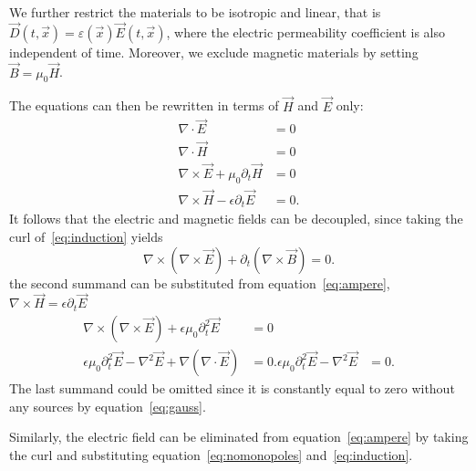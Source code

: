 We further restrict the materials to be isotropic and linear, that is
$\vec{D}(t, \vec{x}) = \varepsilon(\vec{x}) \vec{E}(t, \vec{x})$, where the
electric permeability coefficient is also independent of time. Moreover, we
exclude magnetic materials by setting $\vec{B} = \mu_0 \vec{H}$.

The equations can then be rewritten in terms of $\vec{H}$ and $\vec{E}$ only:
\begin{align}
    \nabla \cdot \vec{E} &= 0 \label{eq:gauss}\\
    \nabla \cdot \vec{H} &= 0 \label{eq:nomonopoles}\\
    \nabla \times \vec{E} + \mu_0\partial_t \vec{H} &= 0
    \label{eq:induction}\\
    \nabla \times \vec{H} - \epsilon\partial_t \vec{E} &= 0
    \label{eq:ampere}.
\end{align}
It follows that the electric and magnetic fields can be decoupled, since
taking the curl of~\eqref{eq:induction} yields
\begin{equation}
    \nabla \times (\nabla \times \vec{E}) + \partial_t(\nabla \times
    \vec{B}) = 0.
    \label{}
\end{equation}
the second summand can be substituted from equation~\eqref{eq:ampere},
$\nabla \times \vec{H} = \epsilon\partial_t \vec{E}$
\begin{align}
    \nabla \times (\nabla \times \vec{E}) + \epsilon\mu_0\partial_t^2 \vec{E} &= 0\\
    \epsilon\mu_0\partial_t^2 \vec{E} - \nabla^2 \vec{E} + \nabla (\nabla \cdot \vec{E}) &= 0.
    \epsilon\mu_0\partial_t^2 \vec{E} - \nabla^2 \vec{E} &= 0.
    \label{eq:wave-electric-field}
\end{align}
The last summand could be omitted since it is constantly equal to zero
without any sources by equation~\eqref{eq:gauss}.

Similarly, the electric field can be eliminated from
equation~\eqref{eq:ampere} by taking the curl and substituting
equation~\eqref{eq:nomonopoles} and~\eqref{eq:induction}.

